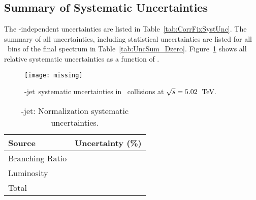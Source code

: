 \subsection{Summary of Systematic Uncertainties}

The \pt-independent uncertainties are listed in Table~\ref{tab:CorrFixSystUnc}. 
The summary of all uncertainties, including statistical uncertainties are listed for all \ptchjet\ bins of the final spectrum in Table~\ref{tab:UncSum_Dzero}.
Figure~\ref{fig:SysUnce_Dzero} shows all relative systematic uncertainties as a function of \ptchjet.

\begin{figure}[bth]
\centering
\texttt{[image: missing]}
\caption{\Dzero-jet\ systematic uncertainties in \pp\ collisions at $\sqrt{s}=5.02$~TeV.}
\label{fig:SysUnce_Dzero}
\end{figure}


\begin{table}[bth]
\caption{\Dzero-jet: Normalization systematic uncertainties.}
     \label{tab:CorrFixSystUnc_Dzero}
\begin{center}
    \begin{tabular}{lr}
    \hline
Source & Uncertainty (\%) \\ \hline
Branching Ratio &  \\
Luminosity &  \\
\hline
Total &  \\
\hline
    \end{tabular}
    \end{center}
    \end{table}
    
